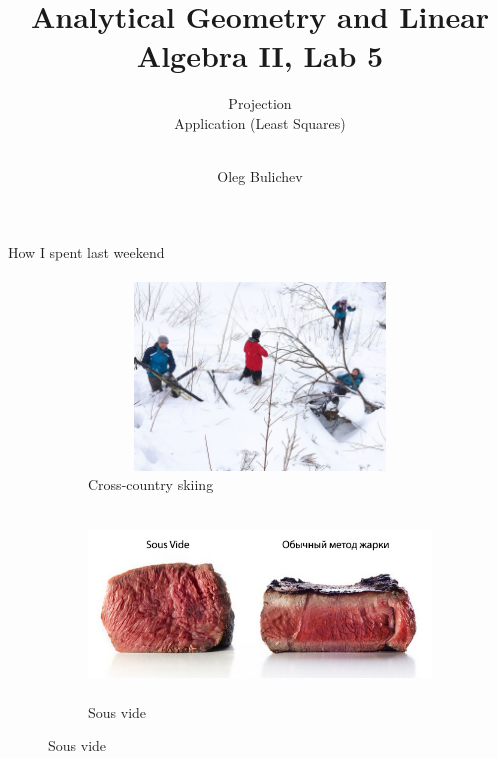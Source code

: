 \documentclass[aspectratio=169]{beamer}
\title[AGLA2]{Analytical Geometry and Linear Algebra II, Lab 5} %
\subtitle{Projection \\ Application (Least Squares) \\ \ 
         } %
\author{Oleg Bulichev}
\newcommand{\fbckg}[1]{\usebackgroundtemplate{\texttt{[image: \#1]}}}%
\begin{document}
\fbckg{fibeamer/figs/title_page.png}

\fbckg{fibeamer/figs/common.png}

\begin{frame}[c]{How I spent last weekend}
    \framesubtitle{}
    \begin{figure}[H]
        \begin{subfigure}{0.49\textwidth}
            \centering\includegraphics[height=5cm,width=1\textwidth,keepaspectratio]{skate-skiing.jpg}
            \caption{Cross-country skiing}
            \label{fig:file_name1}
        \end{subfigure}
        \begin{subfigure}{0.49\textwidth}
            \centering\includegraphics[height=5cm,width=1\textwidth,keepaspectratio]{sous_vide.jpg}
            \caption{Sous vide}
            \label{fig:file_name2}
        \end{subfigure}

    \end{figure}
\end{frame}
\end{document}
